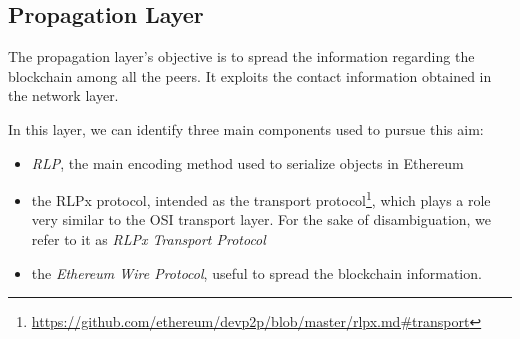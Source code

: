\subsection{Propagation Layer}
\label{sec:propagation-layer}

The propagation layer's objective is to spread the information regarding the
blockchain among all the peers. It exploits the contact information obtained in
the network layer.

In this layer, we can identify three main components used to pursue this aim:
\begin{itemize}
  \item \emph{RLP}, the main encoding method used to serialize objects in
  Ethereum
  \item the RLPx protocol, intended as the transport
  protocol\footnote{\url{https://github.com/ethereum/devp2p/blob/master/rlpx.md\#transport}},
  which plays a role very similar to the OSI transport layer. For the sake of
  disambiguation, we refer to it as \emph{RLPx Transport Protocol}
  \item the \emph{Ethereum Wire Protocol}, useful to spread the blockchain
  information.
\end{itemize}
